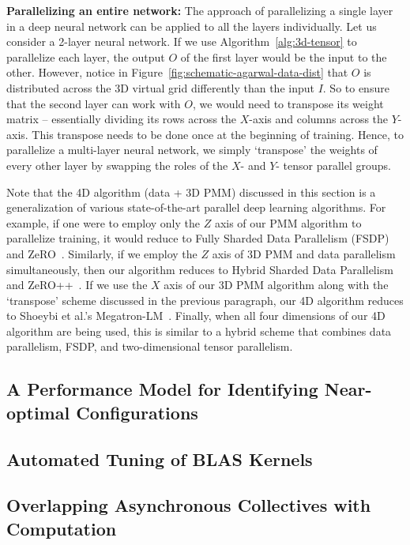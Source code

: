 \vspace{0.08in}
\noindent\textbf{Parallelizing an entire network:} 
The approach of parallelizing a single layer in a deep neural network can be
applied to all the layers individually. Let us consider a 2-layer neural
network.  If we use Algorithm~\ref{alg:3d-tensor} to parallelize each layer,
the output $O$ of the first layer would be the input to the other. However,
notice in Figure~\ref{fig:schematic-agarwal-data-dist} that $O$ is distributed
across the 3D virtual grid differently than the input $I$. So to ensure
that the second layer can work with $O$, we would need to transpose its weight
matrix -- essentially dividing its rows across the $X$-axis and columns across
the $Y$-axis. This transpose needs to be done once at the beginning of
training.  Hence, to parallelize a multi-layer neural network, we simply
`transpose' the weights of every other layer by swapping the roles of the
$X$- and $Y$- tensor parallel groups.

Note that the 4D algorithm (data + 3D PMM) discussed in this section is a generalization of
various state-of-the-art parallel deep learning algorithms. For example, if one
were to employ only the $Z$ axis of our PMM algorithm to parallelize training, it
would reduce to Fully Sharded Data Parallelism (FSDP)~\cite{fsdp} and
ZeRO~\cite{sc2020zero}. Similarly, if we employ the $Z$ axis of 3D PMM and data
parallelism simultaneously, then our algorithm reduces to Hybrid Sharded Data
Parallelism~\cite{fsdp} and ZeRO++~\cite{wang2023zero}. If we use the $X$
axis of our 3D PMM algorithm along with the `transpose' scheme discussed in the
previous paragraph, our 4D algorithm reduces to Shoeybi et al.'s
Megatron-LM~\cite{megatronlm}. Finally, when all four dimensions of our 4D algorithm are being used, this is similar to a hybrid scheme that combines data parallelism, FSDP, and two-dimensional tensor parallelism.


\subsection{A Performance Model for Identifying Near-optimal Configurations}



\subsection{Automated Tuning of BLAS Kernels} \label{sec:blas-tune}



\subsection{Overlapping Asynchronous Collectives with Computation}

